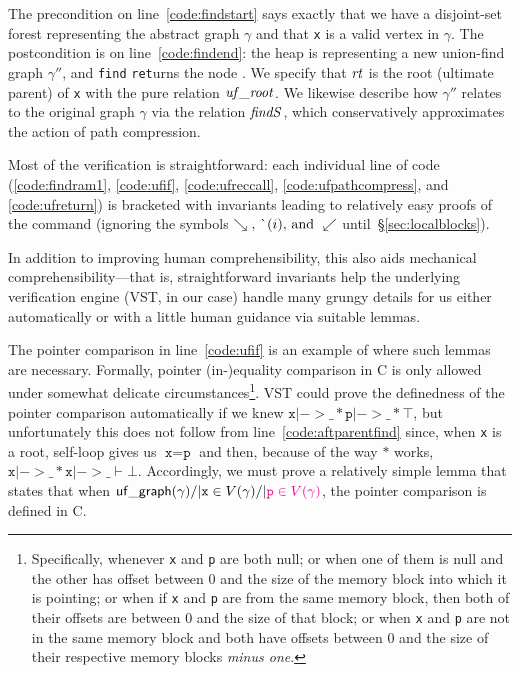 The precondition on line~\ref{code:findstart} says exactly that we have a disjoint-set forest representing the abstract graph $\gamma$ and that \texttt{x} is a valid vertex in $\gamma$.  The postcondition is on line~\ref{code:findend}: the heap is representing a new union-find graph $\gamma''$, and \texttt{find} \texttt{ret}urns the node .  
{\color{magenta}We specify that $\mathit{rt}$
is the root (ultimate parent) of \texttt{x} with the pure relation $\mathit{uf\_root}$.}  
We likewise describe how $\gamma''$ 
relates to the original graph $\gamma$ via the relation $\mathit{findS}$, which 
{\color{magenta}conservatively approximates} the action of path compression.

Most of the verification is straightforward: each individual line of code 
(\ref{code:findram1}, \ref{code:ufif}, \ref{code:ufreccall}, \ref{code:ufpathcompress}, 
and \ref{code:ufreturn}) is bracketed with invariants leading to relatively easy proofs 
of the command (ignoring the symbols $\searrow \text{, } \lightning(i) \text{, and } 
\swarrow$ until~\S\ref{sec:localblocks}).  

In addition to improving human comprehensibility, this 
also aids mechanical comprehensibility---that is, straightforward 
invariants help the underlying verification engine (VST, in our case) handle many grungy 
details for us either automatically or with a little human guidance via suitable lemmas.

The pointer comparison in line~\ref{code:ufif} is an example of where 
such lemmas are necessary. 
Formally, pointer (in-)equality comparison in C is only allowed under somewhat delicate 
circumstances\footnote {\color{magenta}\label{footnote:pointereq}Specifically, 
whenever \texttt{x} and \texttt{p} are both null; or when one of them is null and the 
other has offset between 0 and the size of the memory block into which it is pointing; 
or when if \texttt{x} and \texttt{p} are from the same memory block, then both of their 
offsets are between 0 and the size of that block; or when \texttt{x} and \texttt{p} are 
not in the same memory block and both have offsets between 0 and the size of their 
respective memory blocks \emph{minus one}.}.  VST could prove the definedness of the 
pointer comparison automatically if we knew 
$\texttt{x} |-> \_ * \texttt{p} |-> \_ * \top$, but
unfortunately this does not follow from line~\ref{code:aftparentfind} since, 
when \texttt{x} is a root, self-loop gives us $\texttt{x}=\texttt{p}$ and 
then, because of the way $*$ works, 
$\texttt{x} |-> \_ * \texttt{x} |-> \_ \vdash \bot$.  Accordingly, we must prove a 
relatively simple lemma that states that when $\mathsf{uf\_graph}(\gamma) /| \texttt{x} 
\in V(\gamma) /| {\color{magenta} \texttt{p} \in V(\gamma)}$,
the pointer comparison is defined in C.

